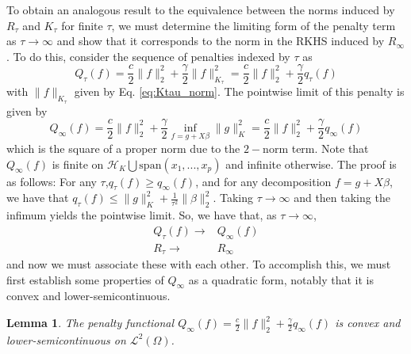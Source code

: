 \documentclass[ejsv2,preprint]{imsart}
\newtheorem{lemma}{Lemma}[section]
\newcommand{\SPAN}[1]{\text{span}\left(#1\right)}
\begin{document}
To obtain an analogous result to the equivalence between the norms induced by $R_\tau$ and $K_\tau$ for finite $\tau$, we must determine the limiting form of the penalty term as $\tau\to\infty$ and show that it corresponds to the norm in the RKHS induced by $R_\infty$. To do this, consider the sequence of penalties indexed by $\tau$ as 
\begin{equation}
    \label{eq:Qtau}
    Q_\tau(f) = \frac{c}{2}\|f\|_2^2+\frac{\gamma}{2}\|f\|_{K_\tau}^2 = \frac{c}{2}\|f\|_2^2+\frac{\gamma}{2}q_\tau(f)
\end{equation}
with $\|f\|_{K_\tau}$ given by Eq. \eqref{eq:Ktau_norm}. The pointwise limit of this penalty is given by
\begin{equation}
    \label{eq:Qinfty}
    Q_{\infty}(f) =\frac{c}{2}\|f\|_2^2+\frac{\gamma}{2}\underset{f=g+X\beta}{\inf}\|g\|_{K}^2=\frac{c}{2}\|f\|_2^2+\frac{\gamma}{2}q_\infty(f)  
\end{equation}
which is the square of a proper norm due to the $2-$norm term. Note that $Q_\infty(f)$ is finite on $\mathcal{H}_K\bigcup\SPAN{x_1,...,x_p} $ and infinite otherwise. The proof is as follows: For any $\tau$,$q_\tau(f)\ge q_\infty(f)$, and for any decomposition $f=g+X\beta$, we have that $q_\tau(f)\le  \|g\|_{K}^2+\frac{1}{\tau^2}\|\beta\|_2^2$. Taking $\tau\to \infty$ and then taking the infimum yields the pointwise limit. So, we have that, as $\tau\to\infty$,
\begin{equation}
    \begin{split}
        Q_\tau(f)\to& Q_{\infty}(f)\\
        R_\tau \to& R_\infty
    \end{split}
\end{equation}
and now we must associate these with each other. To accomplish this, we must first establish some properties of $Q_\infty$ as a quadratic form, notably that it is convex and lower-semicontinuous.
\begin{lemma}\label{lem:Qinfty}
    The penalty functional $Q_\infty(f)=\frac{c}{2}\|f\|_2^2+\frac{\gamma}{2}q_\infty(f)  $ is convex and lower-semicontinuous on $\mathcal{L}^2(\Omega)$.
\end{lemma}
\end{document}
